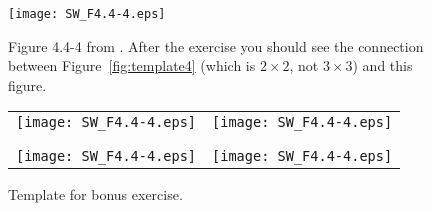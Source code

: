 \documentclass[11pt,titlepage,fleqn]{article}
\begin{document}

\begin{figure}
\centering
\texttt{[image: SW\_F4.4-4.eps]}
\caption{
Figure 4.4-4 from \citet{SteinWysession}.
After the exercise you should see the connection between Figure~\ref{fig:template4} (which is $2 \times 2$, not $3 \times 3$) and this figure.
\label{fig:SW}
}
\end{figure}

\begin{figure}
\hspace{-1cm}
\begin{tabular}{c|c}
\texttt{[image: SW\_F4.4-4.eps]} & \texttt{[image: SW\_F4.4-4.eps]} \\
& \\ \hline
& \\
\texttt{[image: SW\_F4.4-4.eps]} & \texttt{[image: SW\_F4.4-4.eps]} 
\end{tabular}
\caption{
Template for bonus exercise.
\label{fig:SWfour}
}
\end{figure}

\end{document}
